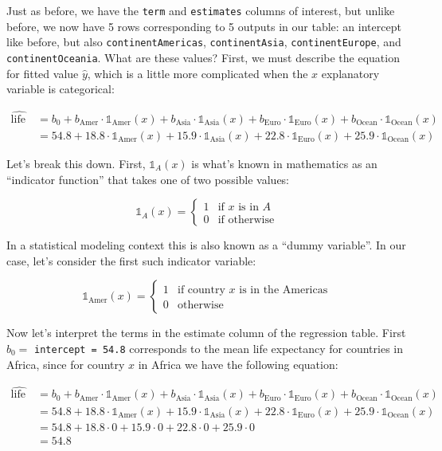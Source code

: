 \documentclass[12pt, krantz2,]{krantz}
\begin{document}
Just as before, we have the \texttt{term} and \texttt{estimates} columns of interest, but unlike before, we now have 5 rows corresponding to 5 outputs in our table: an intercept like before, but also \texttt{continentAmericas}, \texttt{continentAsia}, \texttt{continentEurope}, and \texttt{continentOceania}. What are these values? First, we must describe the equation for fitted value \(\widehat{y}\), which is a little more complicated when the \(x\) explanatory variable is categorical:

\begin{align}
\widehat{\text{life exp}} &= b_0 + b_{\text{Amer}}\cdot\mathbb{1}_{\mbox{Amer}}(x) + b_{\text{Asia}}\cdot\mathbb{1}_{\mbox{Asia}}(x)
+ b_{\text{Euro}}\cdot\mathbb{1}_{\mbox{Euro}}(x) + b_{\text{Ocean}}\cdot\mathbb{1}_{\mbox{Ocean}}(x)\\
&= 54.8 + 18.8\cdot\mathbb{1}_{\mbox{Amer}}(x) + 15.9\cdot\mathbb{1}_{\mbox{Asia}}(x)
+ 22.8\cdot\mathbb{1}_{\mbox{Euro}}(x) + 25.9\cdot\mathbb{1}_{\mbox{Ocean}}(x)
\end{align}

Let's break this down. First, \(\mathbb{1}_{A}(x)\) is what's known in mathematics as an ``indicator function'' that takes one of two possible values:

\[
\mathbb{1}_{A}(x) = \left\{
\begin{array}{ll}
1 & \text{if } x \text{ is in } A \\
0 & \text{if } \text{otherwise} \end{array}
\right.
\]

In a statistical modeling context this is also known as a ``dummy variable''. In our case, let's consider the first such indicator variable:

\[
\mathbb{1}_{\mbox{Amer}}(x) = \left\{
\begin{array}{ll}
1 & \text{if } \text{country } x \text{ is in the Americas} \\
0 & \text{otherwise}\end{array}
\right.
\]

Now let's interpret the terms in the estimate column of the regression table. First \(b_0 =\) \texttt{intercept\ =\ 54.8} corresponds to the mean life expectancy for countries in Africa, since for country \(x\) in Africa we have the following equation:

\begin{align}
\widehat{\text{life exp}} &= b_0 + b_{\text{Amer}}\cdot\mathbb{1}_{\mbox{Amer}}(x) + b_{\text{Asia}}\cdot\mathbb{1}_{\mbox{Asia}}(x)
+ b_{\text{Euro}}\cdot\mathbb{1}_{\mbox{Euro}}(x) + b_{\text{Ocean}}\cdot\mathbb{1}_{\mbox{Ocean}}(x)\\
&= 54.8 + 18.8\cdot\mathbb{1}_{\mbox{Amer}}(x) + 15.9\cdot\mathbb{1}_{\mbox{Asia}}(x)
+ 22.8\cdot\mathbb{1}_{\mbox{Euro}}(x) + 25.9\cdot\mathbb{1}_{\mbox{Ocean}}(x)\\
&= 54.8 + 18.8\cdot 0 + 15.9\cdot 0 + 22.8\cdot 0 + 25.9\cdot 0\\
&= 54.8
\end{align}
\end{document}

